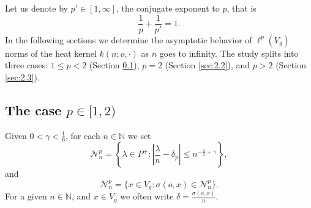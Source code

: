 \documentclass[11pt]{amsart}
\newcommand{\NN}{\mathbb{N}}
\newcommand{\calN}{\mathcal{N}}
\newcommand{\scrN}{\mathscr{N}}
\theoremstyle{plain}
\theoremstyle{definition}
\numberwithin{equation}{section}
\begin{document}
Let us denote by $p' \in [1, \infty]$, the conjugate exponent to $p$, that is
\[
	\frac{1}{p} + \frac{1}{p'} = 1.
\]
In the following sections we determine the asymptotic behavior of $\ell^p(V_g)$ norms of the heat kernel $k(n; o, \cdot)$
as $n$ goes to infinity. The study splits into three cases: $1 \leqslant p < 2$ (Section \ref{sec:2.1}), $p = 2$ (Section 
\ref{sec:2.2}), and $p > 2$ (Section \ref{sec:2.3}).

\subsection{The case $p \in [1, 2)$}
\label{sec:2.1}
Given $0 < \gamma < \frac{1}{6}$, for each $n \in \NN$ we set
\begin{equation}
	\label{eq:22a}
	\calN_n^p=\left\{\lambda \in P^+: \left|\frac{\lambda}{n} - \delta_p \right| \leqslant n^{-\frac{1}{2}+\gamma}\right\},
\end{equation}
and
\begin{equation}
	\label{eq:4a}
	\scrN^p_n=\big\{x \in V_g : \sigma(o, x) \in \calN_n^p\big\}.
\end{equation}
For a given $n \in \NN$, and $x \in V_g$ we often write $\delta = \frac{\sigma(o, x)}{n}$.
\end{document}
